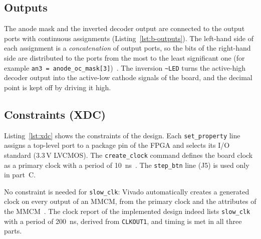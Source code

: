 \documentclass{article}
\begin{document}
\subsection{Outputs}
\label{sec:b-outputs}
The anode mask and the inverted decoder output are connected to the output ports
with continuous assignments (Listing~\ref{lst:b-outputs}). The left-hand side of
each assignment is a \emph{concatenation} of output ports, so the bits of the
right-hand side are distributed to the ports from the most to the least
significant one (for example \texttt{an3 = anode\_oc\_mask[3]})~\cite[Sec.~5.1.14, Sec.~6.1]{ieee1364}.
The inversion \texttt{\textasciitilde LED} turns the active-high decoder output
into the active-low cathode signals of the board, and the decimal point is kept
off by driving it high.



\subsection{Constraints (XDC)}
Listing~\ref{lst:xdc} shows the constraints of the design. Each
\texttt{set\_property} line assigns a top-level port to a package pin of the
FPGA and selects its I/O standard (3.3\,V LVCMOS). The \texttt{create\_clock}
command defines the board clock as a primary clock with a period of
\SI{10}{\nano\second}~\cite[Primary Clocks]{ug903}. The \texttt{step\_btn} line
(J5) is used only in part~C.

No constraint is needed for \texttt{slow\_clk}: Vivado automatically creates a
generated clock on every output of an MMCM, from the primary clock and the
attributes of the MMCM~\cite[Automatically Derived Clocks]{ug903}. The clock
report of the implemented design indeed lists \texttt{slow\_clk} with a period
of \SI{200}{\nano\second}, derived from \texttt{CLKOUT1}, and timing is met
in all three parts.


\end{document}
